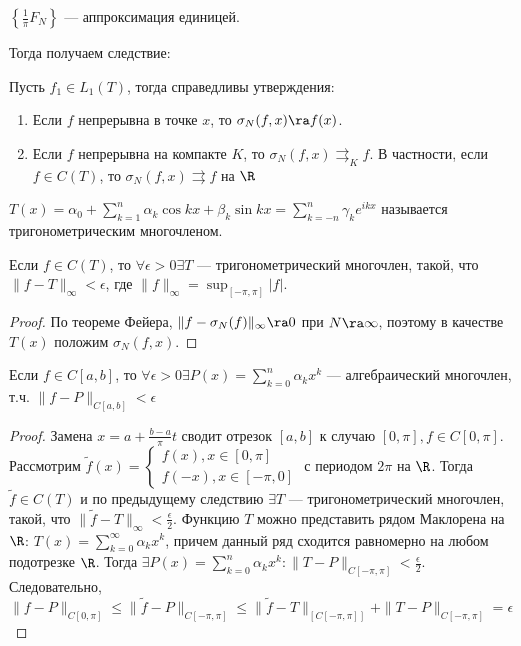 \begin{corollary}
    \(\left\{ \frac{1}{\pi}F_N \right\}\) --- аппроксимация единицей.
\end{corollary}

Тогда получаем следствие:

\begin{theorem}[Фейер]
    Пусть \(f_1 \in L_1(T)\), тогда справедливы утверждения:
    \begin{enumerate}
        \item Если \(f\) непрерывна в точке \(x\), то \(\sigma_N(f, x) \ra f(x)\).
        \item Если \(f\) непрерывна на компакте \(K\), то \(\sigma_N(f, x) \rightrightarrows_K f\). В частности, если \(f \in C(T)\), то \(\sigma_N(f, x) \rightrightarrows f\) на \(\R\)
    \end{enumerate}
\end{theorem}

\begin{definition}
    \(T(x) = \alpha_0 + \sum_{k = 1}^n\alpha_k \cos kx + \beta_k \sin kx = \sum_{k = -n}^n \gamma_k e^{ikx}\) называется тригонометрическим многочленом.
\end{definition}

\begin{corollary}
    Если \(f \in C(T)\), то \(\forall \epsilon > 0 \exists T\) --- тригонометрический многочлен, такой, что \(\|f - T\|_{\infty} < \epsilon\), где \(\|f\|_\infty = \sup_{[-\pi, \pi]} |f|\).
\end{corollary}
\begin{proof}
    По теореме Фейера, \(\|f - \sigma_N(f)\|_{\infty} \ra 0\) при \(N \ra \infty\), поэтому в качестве \(T(x)\) положим \(\sigma_N(f, x)\).
\end{proof}

\begin{corollary}
    Если \(f \in C[a, b]\), то \(\forall \epsilon > 0 \exists P(x) = \sum_{k = 0}^n \alpha_kx^k\) --- алгебраический многочлен, т.ч. \(\|f - P\|_{C[a, b]} < \epsilon\)
\end{corollary}
\begin{proof}
    Замена \(x = a + \frac{b - a}{\pi}t\) сводит отрезок \([a, b]\) к случаю \([0, \pi], f \in C[0, \pi]\). Рассмотрим \(\tilde{f}(x) = \left\{\begin{array}{l}
        f(x), x \in [0, \pi] \\
        f(-x), x \in [-\pi, 0]
    \end{array}\right.\) с периодом \(2\pi\) на \(\R\). Тогда \(\tilde{f} \in C(T)\) и по предыдущему следствию \(\exists T\) --- тригонометрический многочлен, такой, что \(\|\tilde{f} - T\|_\infty < \frac{\epsilon}{2}\). Функцию \(T\) можно представить рядом Маклорена на \(\R\): \(T(x) = \sum_{k = 0}^\infty \alpha_kx^k\), причем данный ряд сходится равномерно на любом подотрезке \(\R\). Тогда \(\exists P(x) = \sum_{k = 0}^n \alpha_kx^k: \|T - P\|_{C[-\pi, \pi]} < \frac{\epsilon}{2}\). Следовательно, \(\|f - P\|_{C[0, \pi]} \le \|\tilde{f} - P\|_{C[-\pi, \pi]} \le \|\tilde{f} - T\|_[C[-\pi, \pi]] + \|T - P\|_{C[-\pi, \pi]} = \epsilon\)
\end{proof}

